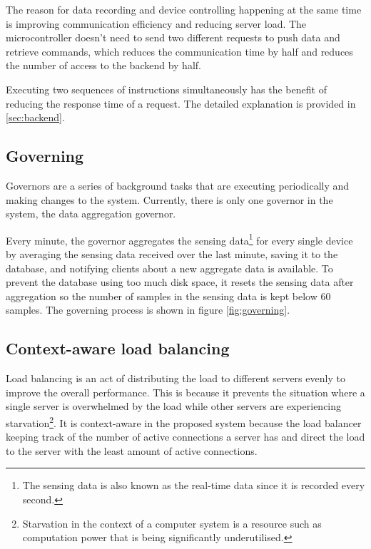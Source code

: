\documentclass[../thesis.tex]{subfiles}
\begin{document}
The reason for data recording and device controlling happening at the same time is improving communication efficiency and reducing server load. The microcontroller doesn't need to send two different requests to push data and retrieve commands, which reduces the communication time by half and reduces the number of access to the backend by half.

Executing two sequences of instructions simultaneously has the benefit of reducing the response time of a request. The detailed explanation is provided in \autoref{sec:backend}.


\subsection{Governing}
\label{sec:governor}

Governors are a series of background tasks that are executing periodically and making changes to the system. Currently, there is only one governor in the system, the data aggregation governor.

Every minute, the governor aggregates the sensing data\footnote{The sensing data is also known as the real-time data since it is recorded every second.} for every single device by averaging the sensing data received over the last minute, saving it to the database, and notifying clients about a new aggregate data is available. To prevent the database using too much disk space, it resets the sensing data after aggregation so the number of samples in the sensing data is kept below 60 samples. The governing process is shown in figure \ref{fig:governing}.


\subsection{Context-aware load balancing}

Load balancing is an act of distributing the load to different servers evenly to improve the overall performance. This is because it prevents the situation where a single server is overwhelmed by the load while other servers are experiencing starvation\footnote{Starvation in the context of a computer system is a resource such as computation power that is being significantly underutilised.}. It is context-aware in the proposed system because the load balancer keeping track of the number of active connections a server has and direct the load to the server with the least amount of active connections.
\end{document}
